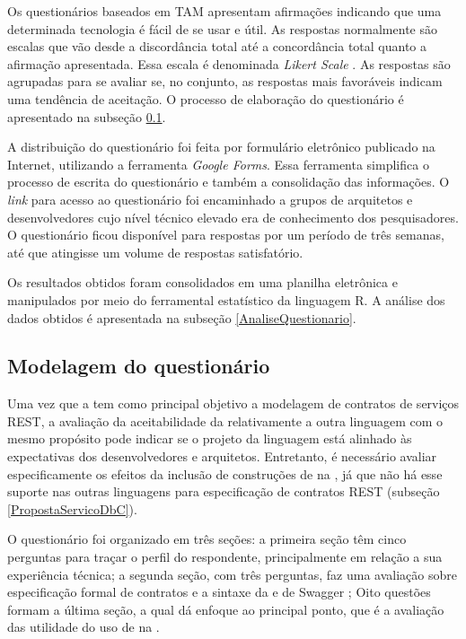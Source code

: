 Os questionários baseados em TAM apresentam afirmações indicando que uma
determinada tecnologia é fácil de se usar e útil. As respostas normalmente são
escalas que vão desde a discordância total até a concordância total quanto a
afirmação apresentada. Essa escala é denominada \textit{Likert Scale}
\cite{allen2007likert}. As respostas são agrupadas para se avaliar se, no
conjunto, as respostas mais favoráveis indicam uma tendência de aceitação. O
processo de elaboração do questionário é apresentado na subseção \ref{ModelagemQuestionario}.

A distribuição do questionário foi feita por formulário eletrônico publicado na
Internet, utilizando a ferramenta \textit{Google Forms}. Essa ferramenta
simplifica o processo de escrita do questionário e também a consolidação das
informações. O \textit{link} para acesso ao questionário foi encaminhado a
grupos de arquitetos e desenvolvedores cujo nível técnico elevado era de
conhecimento dos pesquisadores. O questionário ficou disponível para respostas
por um período de três semanas, até que atingisse um volume de respostas satisfatório.

Os resultados obtidos foram consolidados em uma planilha eletrônica e
manipulados por meio do ferramental estatístico da linguagem R. A análise dos
dados obtidos é apresentada na subseção \ref{AnaliseQuestionario}.


\subsection{Modelagem do questionário}
\label{ModelagemQuestionario}

Uma vez que a
\neoidl{} tem como principal objetivo a modelagem de contratos de serviços REST,
a avaliação da aceitabilidade da \neoidl{} relativamente a outra linguagem com o
mesmo propósito pode indicar se o projeto da linguagem está alinhado às
expectativas dos desenvolvedores e arquitetos. Entretanto, é necessário
avaliar especificamente os efeitos da inclusão de construções de
\designbycontract{} na \neoidl{}, já que não há esse suporte nas outras linguagens para especificação
de contratos REST (subseção \ref{PropostaServicoDbC}).

O questionário foi organizado em três seções: a primeira seção têm cinco
perguntas para traçar o perfil do respondente, principalmente em relação a sua
experiência técnica; a segunda seção, com três perguntas, faz uma avaliação
sobre especificação formal de contratos e a sintaxe da
\neoidl{} e de Swagger \cite{swaggerSite}; 
Oito questões formam a última seção, a qual dá enfoque ao principal ponto, que é
a avaliação das utilidade do uso de \designbycontract{} na \neoidl{}.


